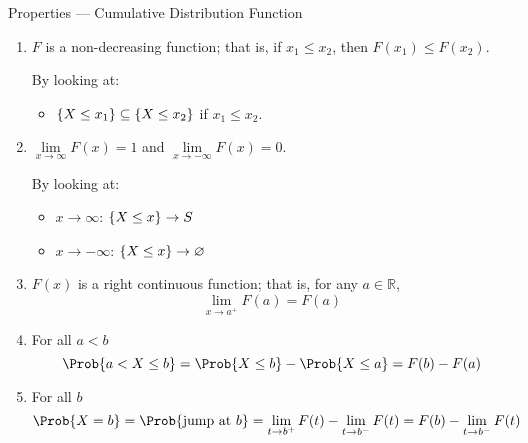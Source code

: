 \begin{Definition}{Properties --- Cumulative Distribution Function}{}
    \begin{enumerate}[label=(\arabic*)]
        \item $ F $ is a non-decreasing function; that is, if $ x_1\le x_2 $,
              then $ F(x_1)\le F(x_2) $.

              By looking at:
              \begin{itemize}
                  \item $ \{X\le x_1\}\subseteq \{X\le x_2\} $
                        if $ x_1\le x_2 $.
              \end{itemize}
        \item $ \lim\limits_{{x} \to {\infty}} F(x)=1 $
              and $ \lim\limits_{{x} \to {-\infty}} F(x)=0 $.

              By looking at:
              \begin{itemize}
                  \item $ x\to\infty $: $ \{X\le x\}\to S $
                  \item $ x\to-\infty $: $ \{X\le x\}\to \varnothing $
              \end{itemize}
        \item $ F(x) $ is a right continuous function; that is,
              for any $ a\in\mathbb{R} $,
              \[ \lim\limits_{{x} \to {a^+}} F(a)=F(a) \]
        \item For all $ a<b $
              \[ \Prob{a<X\le b}=\Prob{X\le b}-\Prob{X\le a}=F(b)-F(a) \]
        \item For all $ b $
              \[ \Prob{X=b}=\Prob{\text{jump at }b}=\lim\limits_{{t} \to {b^+}} F(t)-
                  \lim\limits_{{t} \to {b^-}} F(t)=F(b)-\lim\limits_{{t} \to {b^-}} F(t) \]
    \end{enumerate}
\end{Definition}

